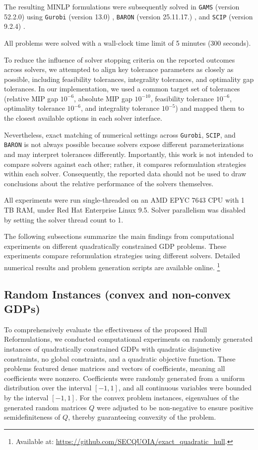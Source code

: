 \documentclass[11pt]{article}
\begin{document}
The resulting MINLP formulations were subsequently solved in \texttt{GAMS} (version 52.2.0) \cite{GAMS} using \texttt{Gurobi} (version 13.0) \cite{GurobiOptimizationLLC}, \texttt{BARON} (version 25.11.17.) \cite{OptimizationFirmBARON}, and \texttt{SCIP} (version 9.2.4) \cite{BolusaniEtal2024OO}.

All problems were solved with a wall-clock time limit of 5 minutes (300 seconds).

To reduce the influence of solver stopping criteria on the reported outcomes across solvers, we attempted to align key tolerance parameters as closely as possible, including feasibility tolerances, integrality tolerances, and optimality gap tolerances.
In our implementation, we used a common target set of tolerances (relative MIP gap $10^{-6}$, absolute MIP gap $10^{-10}$, feasibility tolerance $10^{-6}$, optimality tolerance $10^{-6}$, and integrality tolerance $10^{-5}$) and mapped them to the closest available options in each solver interface.

Nevertheless, exact matching of numerical settings across \texttt{Gurobi}, \texttt{SCIP}, and \texttt{BARON} is not always possible because solvers expose different parameterizations and may interpret tolerances differently. Importantly, this work is not intended to compare solvers against each other; rather, it compares reformulation strategies within each solver. Consequently, the reported data should not be used to draw conclusions about the relative performance of the solvers themselves.

All experiments were run single-threaded on an AMD EPYC 7643 CPU with 1 TB RAM, under Red Hat Enterprise Linux 9.5. Solver parallelism was disabled by setting the solver thread count to 1.


The following subsections summarize the main findings from computational experiments on different quadratically constrained GDP problems.
These experiments compare reformulation strategies using different solvers.
Detailed numerical results and problem generation scripts are available online.
\footnote{Available at: \url{https://github.com/SECQUOIA/exact_quadratic_hull}.}



\subsection{Random Instances (convex and non-convex GDPs)}


To comprehensively evaluate the effectiveness of the proposed Hull Reformulations, we conducted computational experiments on randomly generated instances of quadratically constrained GDPs with quadratic disjunctive constraints, no global constraints, and a quadratic objective function.
These problems featured dense matrices and vectors of coefficients, meaning all coefficients were nonzero.
Coefficients were randomly generated from a uniform distribution over the interval \( [-1,1]\), and all continuous variables were bounded by the interval \( [-1,1]\).
For the convex problem instances, eigenvalues of the generated random matrices \(Q\) were adjusted to be non-negative to ensure positive semidefiniteness of \(Q\), thereby guaranteeing convexity of the problem.
\end{document}

